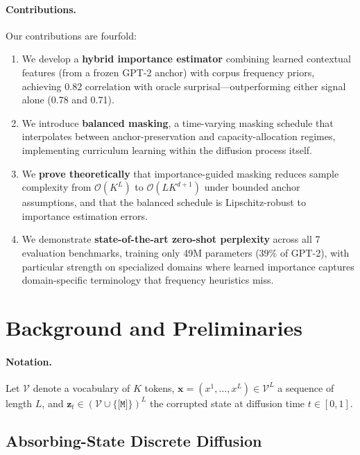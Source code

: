 \documentclass[11pt]{article}
\newcommand{\gV}{\mathcal{V}}
\newcommand{\gO}{\mathcal{O}}
\newcommand{\rvx}{\mathbf{x}}
\newcommand{\rvz}{\mathbf{z}}
\theoremstyle{remark}
\begin{document}
\paragraph{Contributions.} Our contributions are fourfold:
\begin{enumerate}[leftmargin=*,itemsep=1pt,topsep=2pt]
    \item We develop a \textbf{hybrid importance estimator} combining learned contextual features (from a frozen GPT-2 anchor) with corpus frequency priors, achieving 0.82 correlation with oracle surprisal---outperforming either signal alone (0.78 and 0.71).
    \item We introduce \textbf{balanced masking}, a time-varying masking schedule that interpolates between anchor-preservation and capacity-allocation regimes, implementing curriculum learning within the diffusion process itself.
    \item We \textbf{prove theoretically} that importance-guided masking reduces sample complexity from $\gO(K^L)$ to $\gO(LK^{d+1})$ under bounded anchor assumptions, and that the balanced schedule is Lipschitz-robust to importance estimation errors.
    \item We demonstrate \textbf{state-of-the-art zero-shot perplexity} across all 7 evaluation benchmarks, training only 49M parameters (39\% of GPT-2), with particular strength on specialized domains where learned importance captures domain-specific terminology that frequency heuristics miss.
\end{enumerate}

\section{Background and Preliminaries}
\label{sec:background}

\paragraph{Notation.} Let $\gV$ denote a vocabulary of $K$ tokens, $\rvx = (x^1,\ldots,x^L) \in \gV^L$ a sequence of length $L$, and $\rvz_t \in (\gV \cup \{\texttt{[M]}\})^L$ the corrupted state at diffusion time $t \in [0,1]$.

\subsection{Absorbing-State Discrete Diffusion}
\end{document}
